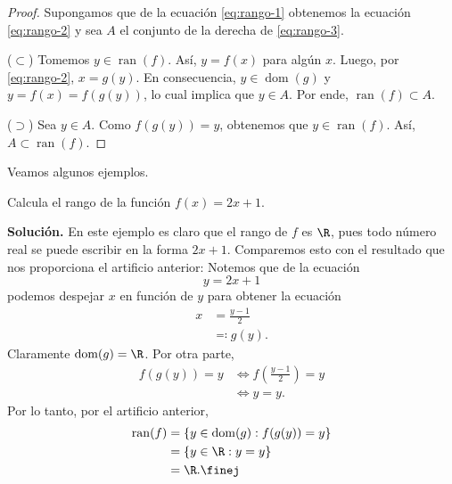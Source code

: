 \documentclass[12pt,a4paper]{book}
\DeclareMathOperator{\dom}{dom}
\DeclareMathOperator{\ran}{ran}
\begin{document}
    \begin{proof}
        Supongamos que de la ecuación \eqref{eq:rango-1} obtenemos la ecuación
        \eqref{eq:rango-2} y sea $A$ el conjunto de la derecha de \eqref{eq:rango-3}.

        ($\subset$) Tomemos $y\in\ran(f)$. Así, $y=f(x)$ para algún $x$. Luego, por \eqref{eq:rango-2},
        $x=g(y)$. En consecuencia, $y\in\dom(g)$ y $y=f(x)=f(g(y))$, lo cual
        implica que $y\in A$. Por ende, $\ran(f)\subset A$.

        ($\supset$) Sea $y\in A$. Como $f(g(y))=y$, obtenemos que $y\in\ran(f)$. Así,
        $A\subset\ran(f)$.
    \end{proof}

    Veamos algunos ejemplos.

    \begin{ejemplo}\label{ejm:29}
        Calcula el rango de la función $f(x)=2x+1$.

        \textbf{Solución.} En este ejemplo es claro que el rango de $f$ es $\R$, pues todo
        número real se puede escribir en la forma $2x+1$. Comparemos esto con el
        resultado que nos proporciona el artificio anterior: Notemos que de la ecuación
        \begin{equation*}
            y=2x+1
        \end{equation*}
        podemos despejar $x$ en función de $y$ para obtener la ecuación
        \begin{align*}
            x&=\frac{y-1}{2}\\
            &\eqqcolon g(y).
        \end{align*}
        Claramente $\dom(g)=\R$. Por otra parte,
        \begin{align*}
            f(g(y))=y&\Leftrightarrow f\left(\frac{y-1}{2}\right)=y\\
            &\Leftrightarrow y=y.
        \end{align*}
        Por lo tanto, por el artificio anterior,
        \begin{align*}
            \ran(f)&=\{y\in\dom(g):f(g(y))=y\}\\
            &=\{y\in\R:y=y\}\\
            &=\R.\finej
        \end{align*}
    \end{ejemplo}
\end{document}
